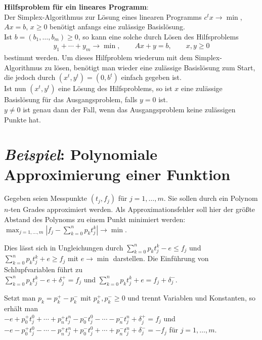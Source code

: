 \linie

\textbf{Hilfsproblem für ein lineares Programm}: \\
Der Simplex-Algorithmus zur Lösung eines linearen Programms
$c^t x \rightarrow \min$, $Ax = b$, $x \ge 0$
benötigt anfangs eine zulässige Basislösung. \\
Ist $b = (b_1, \dotsc, b_m) \ge 0$, so kann eine solche
durch Lösen des Hilfsproblems
\begin{align*}
    y_1 + \dotsb + y_m \rightarrow \min, \qquad
    Ax + y = b, \qquad
    x, y \ge 0
\end{align*}
bestimmt werden.
Um dieses Hilfproblem wiederum mit dem Simplex-Algorithmus zu lösen,
benötigt man wieder eine zulässige Basislösung zum Start, die jedoch
durch $(x^t, y^t) = (0, b^t)$ einfach gegeben ist. \\
Ist nun $(x^t, y^t)$ eine Lösung des Hilfsproblems, so ist $x$ eine
zulässige Basislösung für das Ausgangsproblem, falls $y = 0$ ist. \\
$y \not= 0$ ist genau dann der Fall, wenn das Ausgangsproblem keine
zulässigen Punkte hat.

\pagebreak

\section{%
    \emph{Beispiel}: Polynomiale Approximierung einer Funktion%
}

Gegeben seien Messpunkte $(t_j, f_j)$ für $j = 1, \dotsc, m$.
Sie sollen durch ein Polynom $n$-ten Grades approximiert werden.
Als Approximationsfehler soll hier der größte Abstand des Polynoms
zu einem Punkt minimiert werden:
$\max_{j=1,\dotsc,m}
\left|f_j - \sum_{k=0}^n p_k t_j^k\right| \rightarrow \min$.

Dies lässt sich in Ungleichungen durch
$\sum_{k=0}^n p_k t_j^k - e \le f_j$ und
$\sum_{k=0}^n p_k t_j^k + e \ge f_j$ mit $e \rightarrow \min$ darstellen.
Die Einführung von Schlupfvariablen führt zu \\
$\sum_{k=0}^n p_k t_j^k - e + \delta_j^+ = f_j$ und
$\sum_{k=0}^n p_k t_j^k + e = f_j + \delta_j^-$.

Setzt man $p_k = p_k^+ - p_k^-$ mit $p_k^+, p_k^- \ge 0$ und trennt
Variablen und Konstanten, so erhält man \\
$-e + p_0^+ t_j^0 + \dotsb + p_n^+ t_j^n -
p_0^- t_j^0 - \dotsb - p_n^- t_j^n + \delta_j^+ = f_j$ und \\
$-e - p_0^+ t_j^0 - \dotsb - p_n^+ t_j^n +
p_0^- t_j^0 + \dotsb + p_n^- t_j^n + \delta_j^- = -f_j$
für $j = 1, \dotsc, m$.

